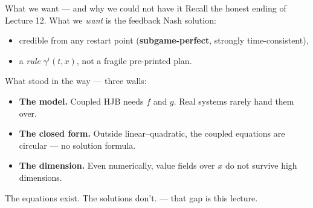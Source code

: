 \documentclass[10pt, aspectratio=169]{beamer}
\begin{document}
\begin{frame}{What we want --- and why we could not have it}
Recall the honest ending of Lecture 12. What we \emph{want} is the \alert{feedback Nash} solution:
\begin{itemize}\setlength\itemsep{1pt}
\item credible from any restart point (\textbf{subgame-perfect}, strongly time-consistent),
\item a \emph{rule} $\gamma^i(t,x)$, not a fragile pre-printed plan.
\end{itemize}
\medskip

\pause
What stood in the way --- three walls:
\begin{itemize}\setlength\itemsep{2pt}
\item \textbf{The model.} Coupled HJB needs $f$ and $g$. Real systems rarely hand them over.
\item \textbf{The closed form.} Outside linear--quadratic, the coupled equations are circular --- no solution formula.
\item \textbf{The dimension.} Even numerically, value fields over $x$ do not survive high dimensions.
\end{itemize}
\medskip

\pause
\begin{center}\large
\alert{The equations exist. The solutions don't.} \quad --- that gap is this lecture.
\end{center}
\end{frame}
\end{document}
